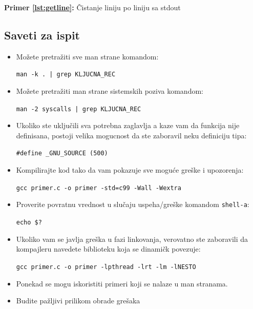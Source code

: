 \documentclass[a4paper, 11pt, twoside]{article}
\newcommand{\scode}[3] {
	\hspace{.06\textwidth} 
	\begin{minipage}[t]{.88\textwidth} %
		\begin{mdframed}[topline=true,bottomline=true,leftline=true,rightline=true,backgroundcolor=gray!22, linecolor=gray!60!black,roundcorner=1mm]
			 

	\begin{center}
		\caption{\textbf{Primer \ref{lst:#3}:} #2}
	\end{center}
	\end{mdframed}
	\end{minipage}

}
\begin{document}
\scode{getline.c}{Čistanje liniju po liniju sa stdout}{getline}

\subsection{Saveti za ispit}

\begin{itemize}
	\item{Možete pretražiti sve man strane komandom: \\ \vspace{-3mm} \begin{center}\texttt{man -k . | grep KLJUCNA\_REC}\end{center}}
			\vspace{1mm} 
	\item{Možete pretražiti man strane sistemskih poziva komandom: \\ \vspace{-3mm} \begin{center}\texttt{man -2 syscalls | grep KLJUCNA\_REC}\end{center}}
			\vspace{1mm} 
		\item{Ukoliko ste uključili sva potrebna zaglavlja a kaze vam da funkcija nije definisana, postoji velika mogucnost da ste zaboravil neku definiciju tipa: \\ \vspace{-3mm} \begin{center}\texttt{\#define \_GNU\_SOURCE (500)}\end{center}}
			\vspace{1mm} 
	\item{Kompilirajte kod tako da vam pokazuje sve moguće greške i upozorenja: \\ \vspace{-3mm} \begin{center}\texttt{gcc primer.c -o primer -std=c99 -Wall -Wextra}\end{center}}
			\vspace{1mm} 
	\item{Proverite povratnu vrednost u slučaju uspeha/greške komandom \texttt{shell-a}: \\ \vspace{-3mm} \begin{center}\texttt{echo \$?}\end{center}}
			\vspace{1mm} 
	\item{Ukoliko vam se javlja greška u fazi linkovanja, verovatno ste zaboravili da kompajleru navedete biblioteku koja se dinamičk povezuje: \\ \vspace{-3mm} \begin{center}\texttt{gcc primer.c -o primer -lpthread -lrt -lm -lNESTO}\end{center}}
			\vspace{1mm} 
		\item{Ponekad se mogu iskoristiti primeri koji se nalaze u man stranama.}
			\vspace{1mm} 
			\item{Budite pažljivi prilikom obrade grešaka}
\end{itemize}
\end{document}
